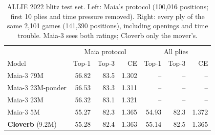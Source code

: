 \begin{table}[t]\centering\small
\caption{ALLIE 2022 blitz test set. Left: Maia's protocol (100,016 positions; first 10 plies and time pressure removed). Right: every ply of the same 2,101 games (141,390 positions), including openings and time trouble. Maia-3 sees both ratings; Cloverb only the mover's.}\label{tab:main}
\begin{tabular}{lrrrrrr}\toprule
 & \multicolumn{3}{c}{Maia protocol} & \multicolumn{3}{c}{All plies}\\
Model & Top-1 & Top-3 & CE & Top-1 & Top-3 & CE\\\midrule
Maia-3 79M & 56.82 & 83.5 & 1.302 & -- & -- & -- \\
Maia-3 23M-ponder & 56.53 & 83.3 & 1.311 & -- & -- & -- \\
Maia-3 23M & 56.32 & 83.1 & 1.321 & -- & -- & -- \\
Maia-3 5M & 55.27 & 82.3 & 1.365 & 54.93 & 82.3 & 1.372 \\
\textbf{Cloverb} (9.2M) & 55.28 & 82.4 & 1.363 & 55.14 & 82.5 & 1.365 \\
\bottomrule\end{tabular}\end{table}
